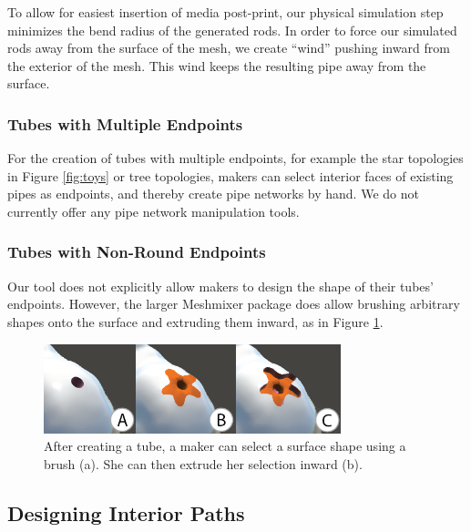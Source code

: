 To allow for easiest insertion of media post-print, our physical simulation step minimizes the bend radius of the generated rods.  In order to force our simulated rods away from the surface of the mesh, we create ``wind'' pushing inward from the exterior of the mesh.  This wind keeps the resulting pipe away from the surface. 

\subsubsection{Tubes with Multiple Endpoints}
For the creation of tubes with multiple endpoints, for example the star topologies in Figure \ref{fig:toys} or tree topologies, makers can select interior faces of existing pipes as endpoints, and thereby create pipe networks by hand.  We do not currently offer any pipe network manipulation tools.


\subsubsection{Tubes with Non-Round Endpoints}
Our tool does not explicitly allow makers to design the shape of their tubes' endpoints.  However, the larger Meshmixer package does allow brushing arbitrary shapes onto the surface and extruding them inward, as in Figure \ref{fig:meshmixer-endpoint}. 

\begin{figure}[h!]
\centering
    \includegraphics[width=3.4in]{figures/meshmixer-endpoint.png}
\caption{After creating a tube, a maker can select a surface shape using a brush (a).  She can then extrude her selection inward (b).}
\label{fig:meshmixer-endpoint}
\end{figure}

\subsection{Designing Interior Paths}

